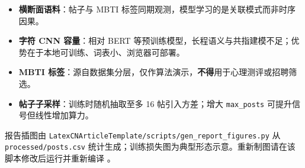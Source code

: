 \begin{itemize}
    \item \textbf{横断面语料}：帖子与 MBTI 标签同期观测，模型学习的是关联模式而非时序因果。
    \item \textbf{字符 CNN 容量}：相对 BERT 等预训练模型，长程语义与共指建模不足；优势在于本地可训练、词表小、浏览器可部署。
    \item \textbf{MBTI 标签}：源自数据集分层，仅作算法演示，\textbf{不得}用于心理测评或招聘筛选。
    \item \textbf{帖子子采样}：训练时随机抽取至多 16 帖引入方差；增大 \texttt{max\_posts} 可提升信号但线性增加算力。
\end{itemize}

\begin{remark}
报告插图由 \texttt{LatexCNArticleTemplate/scripts/gen\_report\_figures.py} 从 \texttt{processed/posts.csv} 统计生成；训练损失图为典型形态示意。重新制图请在该脚本修改后运行并重新编译 \XeLaTeX。
\end{remark}
